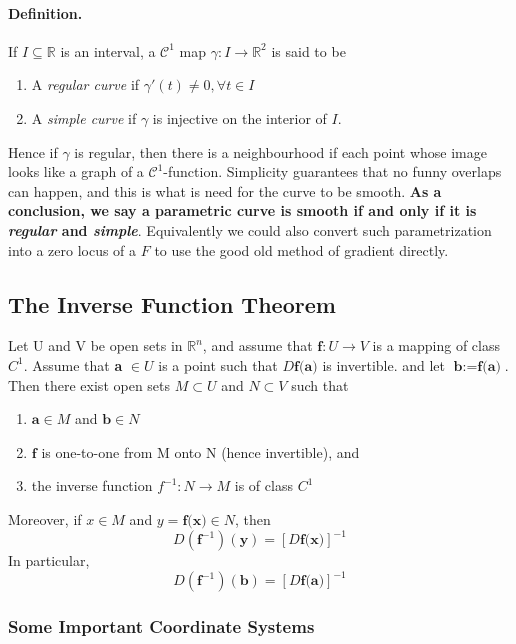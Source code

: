 \documentclass[11pt]{article}
\newcommand{\tb}[1]{\textbf{#1}}
\newcommand{\real}[0]{\mathbb{R}}
\newcommand{\func}[3]{\tb{#1}: {#2} \rightarrow {#3} }
\begin{document}
\paragraph{Definition.}If $I\subseteq \real$ is an interval, a $\mathcal{C}^1$ map $\gamma: I \rightarrow{} \real^2$ is said to be
\begin{enumerate}
    \item A \textit{regular curve} if $\gamma'(t)\neq 0, \forall t\in I$
    \item A \textit{simple curve} if $\gamma$ is injective on the interior of $I$.
\end{enumerate}
Hence if $\gamma$ is regular, then there is a neighbourhood if each point whose image looks like a graph of a $\mathcal{C}^1$-function. Simplicity guarantees that no funny overlaps can happen, and this is what is need for the curve to be smooth. \textbf{As a conclusion, we say a parametric curve is smooth if and only if it is \textit{regular} and \textit{simple}}. Equivalently we could also convert such parametrization into a zero locus of a $F$ to use the good old method of gradient directly.





\subsection{The Inverse Function Theorem} Let U and V be open sets in $\real^n$, and assume that $\func{f}{U}{V}$ is a mapping of class $C^1$. \newline
Assume that \tb{a} $\in U$ is a point such that $D\tb{f(a)}$ is invertible. \newline
and let $\tb{b} := \tb{f(a)}$. Then there exist open sets $M \subset U$ and $N \subset V$ such that
\begin{enumerate}
    \item $\tb{a} \in M$ and $\tb{b} \in N$
    \item $\tb{f}$ is one-to-one from M onto N (hence invertible), and
    \item the inverse function $f^{-1}: N \rightarrow M$ is of class $C^1$
\end{enumerate}
Moreover, if $x \in M$ and $y = \tb{f(x)}\in N$, then $$D(\tb{f}^{-1})(\tb{y}) = [D\tb{f(x)}]^{-1}$$
In particular, $$D(\tb{f}^{-1})(\tb{b}) = [D\tb{f(a)}]^{-1}$$

\subsubsection{Some Important Coordinate Systems}
\end{document}
